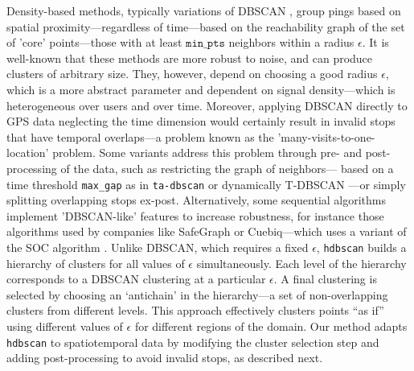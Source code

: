 \documentclass[9pt,twocolumn,twoside]{opticajnl}
\begin{document}
Density-based methods, typically variations of DBSCAN \cite{ester1996density}, group pings based on spatial proximity---regardless of time---based on the reachability graph of the set of 'core' points---those with at least $\texttt{min\_pts}$ neighbors within a radius $\epsilon$. It is well-known that these methods are more robust to noise, and can produce clusters of arbitrary size. They, however, depend on choosing a good radius $\epsilon$, which is a more abstract parameter and dependent on signal density---which is heterogeneous over users and over time. Moreover, applying DBSCAN directly to GPS data neglecting the time dimension would certainly result in invalid stops that have temporal overlaps---a problem known as the 'many-visits-to-one-location' problem. Some variants address this problem through pre- and post-processing of the data, such as restricting the graph of neighbors--- based on a time threshold \texttt{max\_gap} as in \texttt{ta-dbscan} \cite{birant2007st} or dynamically T-DBSCAN \cite{chen2014tdbscan}---or simply splitting overlapping stops ex-post. Alternatively, some sequential algorithms implement 'DBSCAN-like' features to increase robustness, for instance those algorithms used by companies like SafeGraph \cite{safegraph_visit_attribution} or Cuebiq---which uses a variant of the SOC algorithm \cite{xiang2016extracting}.
Unlike DBSCAN, which requires a fixed $\epsilon$, \texttt{hdbscan} \cite{campello2013density} builds a hierarchy of clusters for all values of $\epsilon$ simultaneously. Each level of the hierarchy corresponds to a DBSCAN clustering at a particular $\epsilon$. A final clustering is selected by choosing an `antichain' in the hierarchy---a set of non-overlapping clusters from different levels. This approach effectively clusters points ``as if'' using different values of $\epsilon$ for different regions of the domain. Our method adapts \texttt{hdbscan} to spatiotemporal data by modifying the cluster selection step and adding post-processing to avoid invalid stops, as described next.
\end{document}
